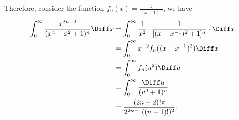 \begin{enumerate}
          Therefore, consider the function \(f_n(x) = \frac{1}{(x + 1)^n}\), we have
          \begin{align*}
              \int_{0}^{\infty} \frac{x^{2n - 2}}{(x^4 - x^2 + 1)^n} \Diff x & = \int_{0}^{\infty} \frac{1}{x^2} \cdot \frac{1}{[(x - x^{-1})^2 + 1]^n} \cdot \Diff x \\
                                                                             & = \int_0^{\infty} x^{-2} f_n((x - x^{-1})^2) \Diff x                                   \\
                                                                             & = \int_0^{\infty} f_n(u^2) \Diff u                                                     \\
                                                                             & = \int_0^{\infty} \frac{\Diff u}{(u^2 + 1)^n}                                          \\
                                                                             & = \frac{(2n - 2)! \pi}{2^{2n - 1} ((n - 1)!)^2}.
          \end{align*}
\end{enumerate}